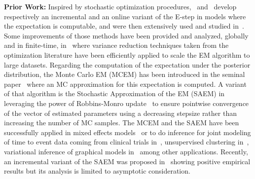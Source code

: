 \documentclass[11pt]{article}
\theoremstyle{t}
\begin{document}
\textbf{Prior Work:} Inspired by stochastic optimization procedures,~\citep{neal1998view} and~\citep{cappe2009line} develop respectively an incremental and an online variant of the \textsf{E-step} in models where the expectation is computable, and were then extensively used and studied in~\citep{nguyen2020mini, liang2009online,cappe2011online}.
Some improvements of those methods have been provided and analyzed, globally and in finite-time, in~\citep{karimi2019global} where variance reduction techniques taken from the optimization literature have been efficiently applied to scale the EM algorithm to large datasets.
Regarding the computation of the expectation under the posterior distribution, the Monte Carlo EM (MCEM) has been introduced in the seminal paper~\citep{wei1990monte} where an MC approximation for this expectation is computed. A variant of that algorithm is the Stochastic Approximation of the EM (SAEM) in~\citep{delyon1999} leveraging the power of Robbins-Monro update~\citep{robbins1951stochastic} to ensure pointwise convergence of the vector of estimated parameters using a decreasing stepsize rather than increasing the number of MC samples.
The MCEM and the SAEM have been successfully applied in mixed effects models~\citep{mcculloch1997maximum,hughes1999mixed,baey2016nonlinear} or to do inference for joint modeling of time to event data coming from clinical trials in~\citep{das2010Inferences}, unsupervised clustering in~\citep{ngChoice2003}, variational inference of graphical models in~\citep{BleiVariational2017} among other applications.
Recently, an incremental variant of the SAEM was proposed in~\citep{kuhn2019properties} showing positive empirical results but its analysis is limited to asymptotic consideration. 
\end{document}
